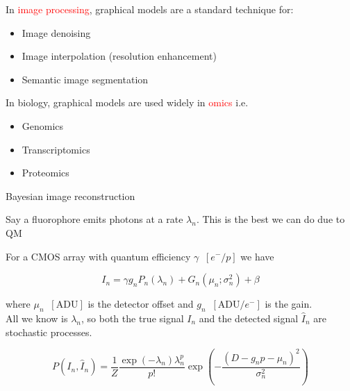 \documentclass{beamer}					%
\begin{document}
\begin{frame}

In \textcolor{red}{image processing}, graphical models are a standard technique for:

\begin{itemize}
\item Image denoising
\item Image interpolation (resolution enhancement)
\item Semantic image segmentation
\end{itemize}

\vspace{0.2in}
In biology, graphical models are used widely in \textcolor{red}{omics} i.e.

\begin{itemize}
\item Genomics
\item Transcriptomics
\item Proteomics
\end{itemize}

\end{frame}

\begin{frame}{Bayesian image reconstruction}

Say a fluorophore emits photons at a rate $\lambda_{n}$. This is the best we can do due to QM
\vspace{0.1in}

For a CMOS array with quantum efficiency $\gamma\;\;[e^{-}/p]$ we have

\begin{equation*}
I_{n} = \gamma g_{n}P_{n}(\lambda_{n}) + G_{n}(\mu_{n};\sigma_{n}^{2}) + \beta
\end{equation*}

where $\mu_{n} \;\;[\mathrm{ADU}]$ is the detector offset and $g_{n}\;\; [\mathrm{ADU}/e^{-}]$ is the gain. \\
\vspace{0.2in}
All we know is $\lambda_{n}$, so both the true signal $I_{n}$ and the detected signal $\hat{I}_{n}$ are stochastic processes. 

\begin{equation*}
P(I_{n},\hat{I}_{n}) = \frac{1}{Z}\frac{\exp\left({-\lambda_{n}}\right)\lambda_{n}^{p}}{p!}\exp\left(-\frac{(D-g_{n}p-\mu_{n})^{2}}{\sigma_{n}^{2}}\right)
\end{equation*}

\end{frame}
\end{document}
